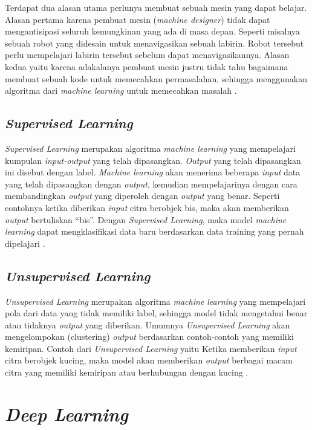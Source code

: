 Terdapat dua alasan utama perlunya membuat sebuah mesin yang dapat belajar. Alasan pertama karena pembuat mesin 
(\emph{machine designer}) tidak dapat mengantisipasi seluruh kemungkinan yang ada di masa depan. Seperti misalnya sebuah robot 
yang didesain untuk menavigasikan sebuah labirin. Robot tersebut perlu mempelajari labirin tersebut sebelum dapat menavigasikannya. 
Alasan kedua yaitu karena adakalanya pembuat mesin justru tidak tahu bagaimana membuat sebuah kode untuk memecahkan permasalahan, 
sehingga menggunakan algoritma dari \emph{machine learning} untuk memecahkan masalah \parencite{Russel2021}.

\subsection{\emph{Supervised Learning}}

\emph{Supervised Learning} merupakan algoritma \emph{machine learning} yang mempelajari kumpulan \emph{input-output} yang telah dipasangkan. 
\emph{Output} yang telah dipasangkan ini disebut dengan label. \emph{Machine learning} akan menerima beberapa \emph{input} data yang telah 
dipasangkan dengan \emph{output}, kemudian mempelajarinya dengan cara membandingkan \emph{output} yang diperoleh dengan \emph{output} yang 
benar. Seperti contohnya ketika diberikan \emph{input} citra berobjek bis, maka akan memberikan \emph{output} bertuliskan “bis”. Dengan 
\emph{Supervised Learning}, maka model \emph{machine learning} dapat mengklasifikasi data baru berdasarkan data training yang pernah 
dipelajari \parencite{Russel2021}.

\subsection{\emph{Unsupervised Learning}}

\emph{Unsupervised Learning} merupakan algoritma \emph{machine learning} yang mempelajari pola dari data yang tidak memiliki label, 
sehingga model tidak mengetahui benar atau tidaknya \emph{output} yang diberikan. Umumnya \emph{Unsupervised Learning} akan mengelompokan 
(clustering) \emph{output} berdasarkan contoh-contoh yang memiliki kemiripan. Contoh dari \emph{Unsupervised Learning} yaitu Ketika memberikan 
\emph{input} citra berobjek kucing, maka model akan memberikan \emph{output} berbagai macam citra yang memiliki kemiripan atau berhubungan dengan 
kucing \parencite{Russel2021}.

\section{\emph{Deep Learning}}
\label{sec:deeplearning}

